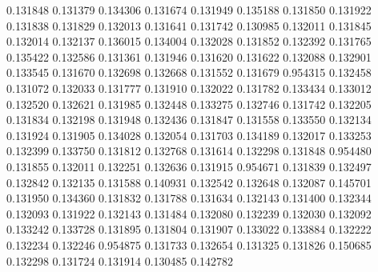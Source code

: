 0.131848
0.131379
0.134306
0.131674
0.131949
0.135188
0.131850
0.131922
0.131838
0.131829
0.132013
0.131641
0.131742
0.130985
0.132011
0.131845
0.132014
0.132137
0.136015
0.134004
0.132028
0.131852
0.132392
0.131765
0.135422
0.132586
0.131361
0.131946
0.131620
0.131622
0.132088
0.132901
0.133545
0.131670
0.132698
0.132668
0.131552
0.131679
0.954315
0.132458
0.131072
0.132033
0.131777
0.131910
0.132022
0.131782
0.133434
0.133012
0.132520
0.132621
0.131985
0.132448
0.133275
0.132746
0.131742
0.132205
0.131834
0.132198
0.131948
0.132436
0.131847
0.131558
0.133550
0.132134
0.131924
0.131905
0.134028
0.132054
0.131703
0.134189
0.132017
0.133253
0.132399
0.133750
0.131812
0.132768
0.131614
0.132298
0.131848
0.954480
0.131855
0.132011
0.132251
0.132636
0.131915
0.954671
0.131839
0.132497
0.132842
0.132135
0.131588
0.140931
0.132542
0.132648
0.132087
0.145701
0.131950
0.134360
0.131832
0.131788
0.131634
0.132143
0.131400
0.132344
0.132093
0.131922
0.132143
0.131484
0.132080
0.132239
0.132030
0.132092
0.133242
0.133728
0.131895
0.131804
0.131907
0.133022
0.133884
0.132222
0.132234
0.132246
0.954875
0.131733
0.132654
0.131325
0.131826
0.150685
0.132298
0.131724
0.131914
0.130485
0.142782
